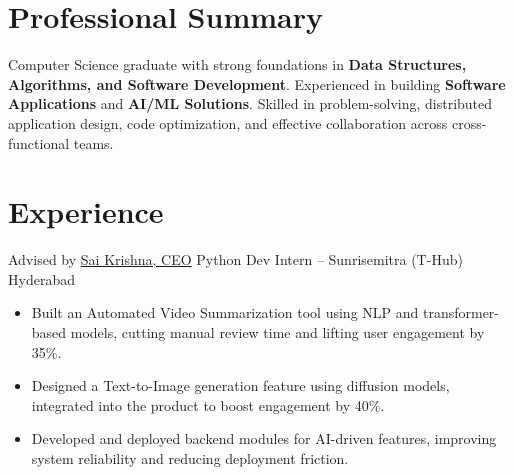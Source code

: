 \documentclass[10pt,a4paper,sans]{moderncv}
\begin{document}
\makecvtitle
\vspace{-1.5cm}

\section{Professional Summary}
\vspace{-0.05cm}
\noindent
Computer Science graduate with strong foundations in \textbf{Data Structures, Algorithms, and Software Development}. Experienced in building \textbf{Software Applications} and \textbf{AI/ML Solutions}. Skilled in problem-solving, distributed application design, code optimization, and effective collaboration across cross-functional teams.

\vspace{-0.15cm}
\section{Experience}
\vspace{-0.15cm}

  {Advised by \href{https://www.linkedin.com/in/sai-krishna-chanda-2696472b0/}{\textcolor{color1}{Sai Krishna, CEO}}}
  {Python Dev Intern -- Sunrisemitra (T-Hub)}
  {Hyderabad}{}{}
\vspace{-0.3cm}
\begin{itemize}[leftmargin=*, itemsep=2pt, topsep=2pt, parsep=0pt]
  \item Built an Automated Video Summarization tool using NLP and transformer-based models, cutting manual review time and lifting user engagement by 35\%.
  \item Designed a Text-to-Image generation feature using diffusion models, integrated into the product to boost engagement by 40\%.
  \item Developed and deployed backend modules for AI-driven features, improving system reliability and reducing deployment friction.
\end{itemize}

\vspace{0.2cm}
\end{document}
